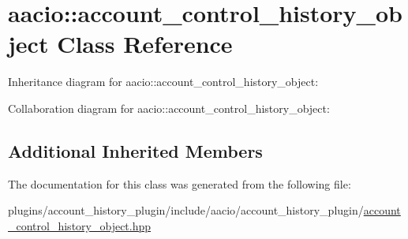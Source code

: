 \hypertarget{classaacio_1_1account__control__history__object}{}\section{aacio\+:\+:account\+\_\+control\+\_\+history\+\_\+object Class Reference}
\label{classaacio_1_1account__control__history__object}


Inheritance diagram for aacio\+:\+:account\+\_\+control\+\_\+history\+\_\+object\+:


Collaboration diagram for aacio\+:\+:account\+\_\+control\+\_\+history\+\_\+object\+:
\subsection*{Additional Inherited Members}


The documentation for this class was generated from the following file\+:\begin{DoxyCompactItemize}
\item 
plugins/account\+\_\+history\+\_\+plugin/include/aacio/account\+\_\+history\+\_\+plugin/\mbox{\hyperlink{account__control__history__object_8hpp}{account\+\_\+control\+\_\+history\+\_\+object.\+hpp}}\end{DoxyCompactItemize}
